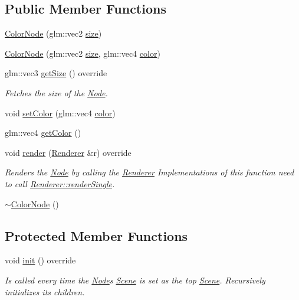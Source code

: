 \subsection*{Public Member Functions}
\begin{DoxyCompactItemize}
\item 
\mbox{\hyperlink{classsage_1_1ColorNode_a2a7235f477d542f28f6bbf1bda63176a}{Color\+Node}} (glm\+::vec2 \mbox{\hyperlink{classsage_1_1ColorNode_a04b687374b9c171ff820c514f15b0ae0}{size}})
\item 
\mbox{\hyperlink{classsage_1_1ColorNode_aa42072fabeb17cc9c3ccd4d769bd8644}{Color\+Node}} (glm\+::vec2 \mbox{\hyperlink{classsage_1_1ColorNode_a04b687374b9c171ff820c514f15b0ae0}{size}}, glm\+::vec4 \mbox{\hyperlink{classsage_1_1ColorNode_a5fc4ee3eac3b56392d7c46a8359ba97c}{color}})
\item 
glm\+::vec3 \mbox{\hyperlink{classsage_1_1ColorNode_ad2ffce290e2cde1697ae609fe0a7b68c}{get\+Size}} () override
\begin{DoxyCompactList}\small\item\em Fetches the size of the \mbox{\hyperlink{classsage_1_1Node}{Node}}. \end{DoxyCompactList}\item 
void \mbox{\hyperlink{classsage_1_1ColorNode_ae64cb2f7ba2a12750952047c6fe69cb4}{set\+Color}} (glm\+::vec4 \mbox{\hyperlink{classsage_1_1ColorNode_a5fc4ee3eac3b56392d7c46a8359ba97c}{color}})
\item 
glm\+::vec4 \mbox{\hyperlink{classsage_1_1ColorNode_af6d7433a247a53dc58019aeadc042008}{get\+Color}} ()
\item 
void \mbox{\hyperlink{classsage_1_1ColorNode_ac2cf18feb8ab4e55dd68ca8b0c4faabf}{render}} (\mbox{\hyperlink{classsage_1_1Renderer}{Renderer}} \&r) override
\begin{DoxyCompactList}\small\item\em Renders the \mbox{\hyperlink{classsage_1_1Node}{Node}} by calling the \mbox{\hyperlink{classsage_1_1Renderer}{Renderer}} Implementations of this function need to call \mbox{\hyperlink{classsage_1_1Renderer_aa79cfd587fa85ae8ea7ccf465825d212}{Renderer\+::render\+Single}}. \end{DoxyCompactList}\item 
\mbox{\hyperlink{classsage_1_1ColorNode_af1864690840922c8b14340d6991eac3e}{$\sim$\+Color\+Node}} ()
\end{DoxyCompactItemize}
\subsection*{Protected Member Functions}
\begin{DoxyCompactItemize}
\item 
void \mbox{\hyperlink{classsage_1_1ColorNode_a1a5a055be2cc8d15b38c5c25eb489e94}{init}} () override
\begin{DoxyCompactList}\small\item\em Is called every time the \mbox{\hyperlink{classsage_1_1Node}{Node}}\textquotesingle{}s \mbox{\hyperlink{classsage_1_1Scene}{Scene}} is set as the top \mbox{\hyperlink{classsage_1_1Scene}{Scene}}. Recursively initializes its children. \end{DoxyCompactList}\end{DoxyCompactItemize}
